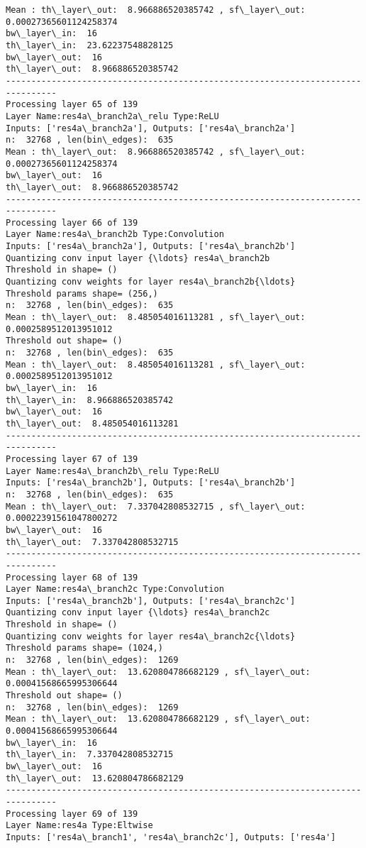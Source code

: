 \documentclass[11pt]{article}
\begin{document}
\begin{Verbatim}[commandchars=\\\{\}]
Mean : th\_layer\_out:  8.966886520385742 , sf\_layer\_out:  0.00027365601124258374
bw\_layer\_in:  16
th\_layer\_in:  23.62237548828125
bw\_layer\_out:  16
th\_layer\_out:  8.966886520385742
--------------------------------------------------------------------------------
Processing layer 65 of 139
Layer Name:res4a\_branch2a\_relu Type:ReLU
Inputs: ['res4a\_branch2a'], Outputs: ['res4a\_branch2a']
n:  32768 , len(bin\_edges):  635
Mean : th\_layer\_out:  8.966886520385742 , sf\_layer\_out:  0.00027365601124258374
bw\_layer\_out:  16
th\_layer\_out:  8.966886520385742
--------------------------------------------------------------------------------
Processing layer 66 of 139
Layer Name:res4a\_branch2b Type:Convolution
Inputs: ['res4a\_branch2a'], Outputs: ['res4a\_branch2b']
Quantizing conv input layer {\ldots} res4a\_branch2b
Threshold in shape= ()
Quantizing conv weights for layer res4a\_branch2b{\ldots}
Threshold params shape= (256,)
n:  32768 , len(bin\_edges):  635
Mean : th\_layer\_out:  8.485054016113281 , sf\_layer\_out:  0.0002589512013951012
Threshold out shape= ()
n:  32768 , len(bin\_edges):  635
Mean : th\_layer\_out:  8.485054016113281 , sf\_layer\_out:  0.0002589512013951012
bw\_layer\_in:  16
th\_layer\_in:  8.966886520385742
bw\_layer\_out:  16
th\_layer\_out:  8.485054016113281
--------------------------------------------------------------------------------
Processing layer 67 of 139
Layer Name:res4a\_branch2b\_relu Type:ReLU
Inputs: ['res4a\_branch2b'], Outputs: ['res4a\_branch2b']
n:  32768 , len(bin\_edges):  635
Mean : th\_layer\_out:  7.337042808532715 , sf\_layer\_out:  0.00022391561047800272
bw\_layer\_out:  16
th\_layer\_out:  7.337042808532715
--------------------------------------------------------------------------------
Processing layer 68 of 139
Layer Name:res4a\_branch2c Type:Convolution
Inputs: ['res4a\_branch2b'], Outputs: ['res4a\_branch2c']
Quantizing conv input layer {\ldots} res4a\_branch2c
Threshold in shape= ()
Quantizing conv weights for layer res4a\_branch2c{\ldots}
Threshold params shape= (1024,)
n:  32768 , len(bin\_edges):  1269
Mean : th\_layer\_out:  13.620804786682129 , sf\_layer\_out:  0.00041568665995306644
Threshold out shape= ()
n:  32768 , len(bin\_edges):  1269
Mean : th\_layer\_out:  13.620804786682129 , sf\_layer\_out:  0.00041568665995306644
bw\_layer\_in:  16
th\_layer\_in:  7.337042808532715
bw\_layer\_out:  16
th\_layer\_out:  13.620804786682129
--------------------------------------------------------------------------------
Processing layer 69 of 139
Layer Name:res4a Type:Eltwise
Inputs: ['res4a\_branch1', 'res4a\_branch2c'], Outputs: ['res4a']

\end{Verbatim}
\end{document}
